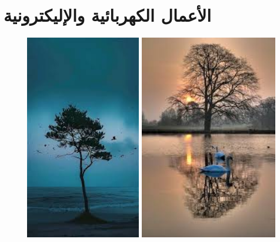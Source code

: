 \documentclass{article}
\begin{document}
\section{الأعمال الكهربائية والإليكترونية}
\begin{figure}[H]
    \centering

    \begin{minipage}{0.45\textwidth}
        \centering
        \includegraphics[height=9cm,width=\textwidth]{electric/1.jpg}
    \end{minipage}
    \hfill
    \begin{minipage}{0.45\textwidth}
        \centering
        \includegraphics[height=9cm,width=\textwidth]{electric/2.jpg}
    \end{minipage}
    \vspace{0.5cm} %


\end{figure}
\end{document}

